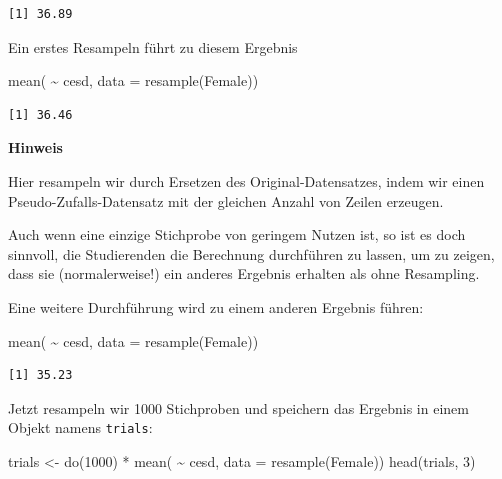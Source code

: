 \documentclass[
  ngerman,
]{scrbook}
\newenvironment{Shaded}{\begin{snugshade}}{\end{snugshade}}
\newcommand{\AttributeTok}[1]{\textcolor[rgb]{0.77,0.63,0.00}{#1}}
\newcommand{\DecValTok}[1]{\textcolor[rgb]{0.00,0.00,0.81}{#1}}
\newcommand{\FunctionTok}[1]{\textcolor[rgb]{0.00,0.00,0.00}{#1}}
\newcommand{\NormalTok}[1]{#1}
\newcommand{\OtherTok}[1]{\textcolor[rgb]{0.56,0.35,0.01}{#1}}
\newcommand{\SpecialCharTok}[1]{\textcolor[rgb]{0.00,0.00,0.00}{#1}}
\newenvironment{hinweis}[1]
  {
  \begin{itemize}
  \renewcommand{\labelitemi}{
    \raisebox{1.8\height}[0pt][0pt]{
      {\setkeys{Gin}{width=7em,keepaspectratio}
        {\Large \textcolor{dark-fom-green}\faHandORight}}
        }
  }
  \begin{blackbox}
        \bgroup\color{dark-fom-green}
          {\textbf{Hinweis}}
        \egroup
  \item
  }
  {
  \end{blackbox}
  \end{itemize}
  }
\newenvironment{note}[1]
  {
  \begin{itemize}
  \renewcommand{\labelitemi}{
    \raisebox{-.01\height}[0pt][0pt]{
      {\setkeys{Gin}{width=7em,keepaspectratio}
        {\normalsize \textcolor{dark-fom-green}\faHashtag}}
        }
  }
  \begin{blackbox}
   \item
    }
    {
  \end{blackbox}
  \end{itemize}
  }
\begin{document}
\begin{verbatim}
[1] 36.89
\end{verbatim}

Ein erstes Resampeln führt zu diesem Ergebnis

\begin{Shaded}
\begin{Highlighting}[]
\FunctionTok{mean}\NormalTok{( }\SpecialCharTok{\textasciitilde{}}\NormalTok{ cesd, }\AttributeTok{data =} \FunctionTok{resample}\NormalTok{(Female))}
\end{Highlighting}
\end{Shaded}

\begin{verbatim}
[1] 36.46
\end{verbatim}

\begin{hinweis}{hinweis}
Hier resampeln wir durch Ersetzen des Original-Datensatzes, indem wir einen Pseudo-Zufalls-Datensatz mit der gleichen Anzahl von Zeilen erzeugen.

\end{hinweis}

\begin{note}{hinweis}
Auch wenn eine einzige Stichprobe von geringem Nutzen ist, so ist es doch sinnvoll, die Studierenden die Berechnung durchführen zu lassen, um zu zeigen, dass sie (normalerweise!) ein anderes Ergebnis erhalten als ohne Resampling.

\end{note}

Eine weitere Durchführung wird zu einem anderen Ergebnis führen:

\begin{Shaded}
\begin{Highlighting}[]
\FunctionTok{mean}\NormalTok{( }\SpecialCharTok{\textasciitilde{}}\NormalTok{ cesd, }\AttributeTok{data =} \FunctionTok{resample}\NormalTok{(Female))}
\end{Highlighting}
\end{Shaded}

\begin{verbatim}
[1] 35.23
\end{verbatim}

Jetzt resampeln wir 1000 Stichproben und speichern das Ergebnis in einem Objekt namens \texttt{trials}:

\begin{Shaded}
\begin{Highlighting}[]
\NormalTok{trials }\OtherTok{\textless{}{-}} \FunctionTok{do}\NormalTok{(}\DecValTok{1000}\NormalTok{) }\SpecialCharTok{*} \FunctionTok{mean}\NormalTok{( }\SpecialCharTok{\textasciitilde{}}\NormalTok{ cesd, }\AttributeTok{data =} \FunctionTok{resample}\NormalTok{(Female))}
\FunctionTok{head}\NormalTok{(trials, }\DecValTok{3}\NormalTok{)}
\end{Highlighting}
\end{Shaded}
\end{document}

